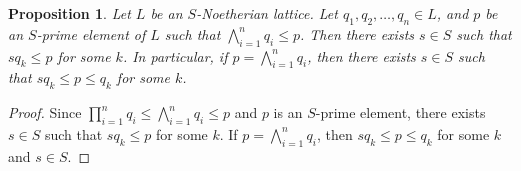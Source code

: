 \documentclass[10pt,twoside,a4]{amsart}
\numberwithin{equation}{section}
\theoremstyle{plain}
\newtheorem{prop}[lem]{Proposition}
\theoremstyle{definition}
\begin{document}
\begin{prop}\label{pro1} 
	Let $L$ be an $S$-Noetherian lattice. Let $q_1,q_2,\dots,q_n\in L$, and $p$ be an $S$-prime element of $L$ such that $\displaystyle \bigwedge_{i=1}^{n} q_i\leq p$. Then there exists $s\in S$ such that $sq_k\leq p$ for some $k$. In particular, if $\displaystyle p=\bigwedge_{i=1}^{n} q_i$, then there exists $s\in S$ such that $sq_k\leq p\leq q_k$ for some $k$.
\end{prop}

\begin{proof} 
	Since $\displaystyle \prod_{i=1}^{n} q_i \leq \bigwedge_{i=1}^{n} q_i\leq p$ and $p$ is an $S$-prime element, there exists $s\in S$ such that $sq_k\leq p$ for some $k$. If $\displaystyle p=\bigwedge_{i=1}^{n} q_i$, then $sq_k\leq p\leq q_k$ for some $k$ and $s\in S$.
\end{proof}	
\end{document}

